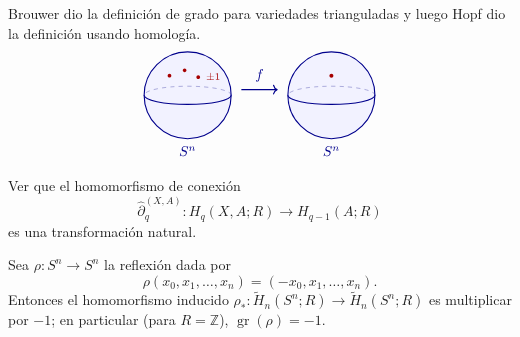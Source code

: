 \begin{nota}
Brouwer dio la definición de grado para variedades trianguladas y luego Hopf dio la definición usando homología.
\[
\begin{tikzpicture}[baseline=(current bounding box.center), scale=0.95]
    \fill[blue!5] (0, 0) circle (1.15);
    \draw[dashed, blue!55!black!55]
        (1.15, 0) arc[start angle=0, end angle=180, x radius=1.15, y radius=0.24];
    \draw[thick, blue!55!black] (0, 0) circle (1.15);
    \draw[thick, blue!55!black]
        (-1.15, 0) arc[start angle=180, end angle=360, x radius=1.15, y radius=0.24];
    \node[blue!55!black] at (0, -1.48) {$S^n$};

    \fill[red!65!black] (-0.48, 0.52) circle (1.4pt);
    \fill[red!65!black] (-0.08, 0.66) circle (1.4pt);
    \fill[red!65!black] ( 0.28, 0.48) circle (1.4pt)
        node[right=2pt] {\scriptsize $\pm 1$};

    \draw[->, thick, blue!55!black] (1.42, 0.15) -- (2.38, 0.15)
        node[midway, above=2pt] {$f$};

    \fill[blue!5] (3.80, 0) circle (1.15);
    \draw[dashed, blue!55!black!55]
        (4.95, 0) arc[start angle=0, end angle=180, x radius=1.15, y radius=0.24];
    \draw[thick, blue!55!black] (3.80, 0) circle (1.15);
    \draw[thick, blue!55!black]
        (2.65, 0) arc[start angle=180, end angle=360, x radius=1.15, y radius=0.24];
    \node[blue!55!black] at (3.80, -1.48) {$S^n$};

    \fill[red!65!black] (3.80, 0.52) circle (1.5pt);
\end{tikzpicture}
\]
\end{nota}
\begin{ejercicio}
Ver que el homomorfismo de conexión
\[
\hat{\partial}_q^{(X, A)} \colon H_q(X, A; R) \longrightarrow H_{q-1}(A; R)
\]
es una transformación natural.
\end{ejercicio}

\begin{prop}
Sea $\rho \colon S^n \to S^n$ la reflexión dada por
\[
\rho(x_0, x_1, \dots, x_n) = (-x_0, x_1, \dots, x_n).
\]
Entonces el homomorfismo inducido $\rho_* \colon \widetilde{H}_n(S^n; R) \to \widetilde{H}_n(S^n; R)$ es multiplicar por $-1$; en particular (para $R = \mathbb{Z}$), $\operatorname{gr}(\rho) = -1$.
\end{prop}

